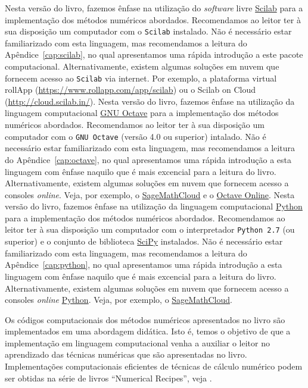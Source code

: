 \ifisscilab
Nesta versão do livro, fazemos ênfase na utilização do \emph{software} livre \href{http://www.scilab.org/}{Scilab} para a implementação dos métodos numéricos abordados. Recomendamos ao leitor ter à sua disposição um computador com o \verb+Scilab+ instalado. Não é necessário estar familiarizado com esta linguagem, mas recomendamos a leitura do Apêndice~\ref{cap:scilab}, no qual apresentamos uma rápida introdução a este pacote computacional. Alternativamente, existem algumas soluções em nuvem que fornecem acesso ao \verb+Scilab+ via internet. Por exemplo, a plataforma virtual rollApp (\url{https://www.rollapp.com/app/scilab}) ou o Scilab on Cloud (\url{http://cloud.scilab.in/}).
\fi
\ifisoctave
Nesta versão do livro, fazemos ênfase na utilização da linguagem computacional \href{https://www.gnu.org/software/octave/}{GNU Octave} para a implementação dos métodos numéricos abordados. Recomendamos ao leitor ter à sua disposição um computador com o \verb+GNU Octave+ (versão 4.0 ou superior) intalado. Não é necessário estar familiarizado com esta linguagem, mas recomendamos a leitura do Apêndice~\ref{cap:octave}, no qual apresentamos uma rápida introdução a esta linguagem com ênfase naquilo que é mais excencial para a leitura do livro. Alternativamente, existem algumas soluções em nuvem que fornecem acesso a consoles {\it online}. Veja, por exemplo, o \href{https://cloud.sagemath.com/}{SageMathCloud} e o \href{https://octave-online.net/}{Octave Online}.
\fi
\ifispython
Nesta versão do livro, fazemos ênfase na utilização da linguagem computacional \href{https://www.python.org/}{Python} para a implementação dos métodos numéricos abordados. Recomendamos ao leitor ter à sua disposição um computador com o interpretador \verb+Python 2.7+ (ou superior) e o conjunto de biblioteca \href{https://www.scipy.org/}{SciPy} instalados. Não é necessário estar familiarizado com esta linguagem, mas recomendamos a leitura do Apêndice~\ref{cap:python}, no qual apresentamos uma rápida introdução a esta linguagem com ênfase naquilo que é mais excencial para a leitura do livro. Alternativamente, existem algumas soluções em nuvem que fornecem acesso a consoles {\it online} \href{https://www.python.org/}{Python}. Veja, por exemplo, o \href{https://cloud.sagemath.com/}{SageMathCloud}.
\fi

Os códigos computacionais dos métodos numéricos apresentados no livro são implementados em uma abordagem didática. Isto é, temos o objetivo de que a implementação em linguagem computacional venha a auxiliar o leitor no aprendizado das técnicas numéricas que são apresentadas no livro. Implementações computacionais eficientes de técnicas de cálculo numérico podem ser obtidas na série de livros ``Numerical Recipes'', veja \cite{numerical}.


